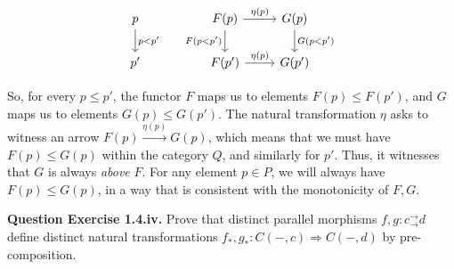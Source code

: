 \documentclass[11pt]{report}
\newcommand{\nt}{\Rightarrow}
\newcommand*{\question}[1]{\leavevmode\newline \textbf{Question #1.}}
\begin{document}
\[\begin{tikzcd}
	p && {F(p)} & {G(p)} \\
	p' && {F(p')} & {G(p')}
	\arrow["{\eta(p)}", from=1-3, to=1-4]
	\arrow["{\eta(p)}", from=2-3, to=2-4]
	\arrow["{F(p<p')}"', from=1-3, to=2-3]
	\arrow["{G(p < p')}", from=1-4, to=2-4]
	\arrow["{p< p'}", from=1-1, to=2-1]
\end{tikzcd}\]

So, for every $p \leq p'$, the functor $F$ maps us to elements $F(p) \leq F(p')$, and $G$ maps us to elements $G(p) \leq G(p')$. The natural transformation $\eta$
asks to witness an arrow $F(p) \xrightarrow{\eta(p)} G(p)$, which means that we must have $F(p) \leq G(p)$ within the category $Q$, and similarly for $p'$.
Thus, it witnesses that $G$ is always \emph{above} $F$. For any element $p \in P$, we will always have $F(p) \leq G(p)$, in a way that is consistent with the
monotonicity of $F, G$.


\question{Exercise 1.4.iv} Prove that distinct parallel morphisms $f, g: c^\to_\to d$ define distinct natural transformations $f_*, g_*: C(-, c) \nt C(-, d)$ by pre-composition.
\end{document}

